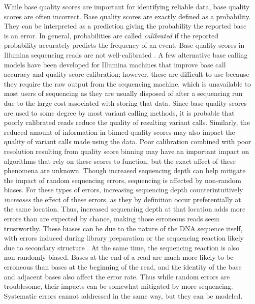 While base quality scores are important for identifying reliable data, base quality scores are often incorrect.
Base quality scores are exactly defined as a probability. They can be interpreted as a prediction giving the probability the reported base is an error. In general, probabilities are called \textit{calibrated} if the reported probability accurately predicts the frequency of an event.
Base quality scores in Illumina sequencing reads are not well-calibrated \parencite{callahan_dada2:_2016}. %
A few alternative base calling models have been developed for Illumina machines that improve base call accuracy and quality score calibration; however, these are difficult to use because they require the raw output from the sequencing machine, which is unavailable to most users of sequencing as they are usually disposed of after a sequencing run due to the large cost associated with storing that data. %
Since base quality scores are used to some degree by most variant calling methods, it is probable that poorly calibrated reads reduce the quality of resulting variant calls.
Similarly, the reduced amount of information in binned quality scores may also impact the quality of variant calls made using the data.
Poor calibration combined with poor resolution resulting from quality score binning may have an important impact on algorithms that rely on these scores to function, but the exact affect of these phenomena are unknown.
Though increased sequencing depth can help mitigate the impact of random sequencing errors, sequencing is affected by non-random biases. %
For these types of errors, increasing sequencing depth counterintuitively \textit{increases} the effect of these errors, as they by definition occur preferentially at the same location. Thus, increased sequencing depth at that location adds more errors than are expected by chance, making those erroneous reads seem trustworthy. 
These biases can be due to the nature of the DNA sequence itself, with errors induced during library preparation or the sequencing reaction likely due to secondary structure \parencite{meacham_identification_2011, nakamura_sequence-specific_2011}.
At the same time, the sequencing reaction is also non-randomly biased. Bases at the end of a read are much more likely to be erroneous than bases at the beginning of the read, and the identity of the base and adjacent bases also affect the error rate. %
Thus while random errors are troublesome, their impacts can be somewhat mitigated by more sequencing. Systematic errors cannot addressed in the same way, but they can be modeled.

